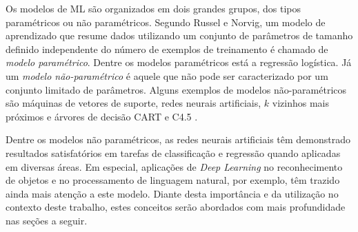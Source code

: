 Os modelos de ML são organizados em dois grandes grupos, dos tipos paramétricos ou não paramétricos. Segundo Russel e Norvig, um modelo de aprendizado que resume dados utilizando um conjunto de parâmetros de tamanho definido independente do número de exemplos de treinamento é chamado de \emph{modelo paramétrico}. Dentre os modelos paramétricos está a regressão logística. Já um \emph{modelo não-paramétrico} é aquele que não pode ser caracterizado por um conjunto limitado de parâmetros. Alguns exemplos de modelos não-paramétricos são máquinas de vetores de suporte, redes neurais artificiais, $k$ vizinhos mais próximos e árvores de decisão CART e C4.5 \cite{russell2016artificial}.

Dentre os modelos não paramétricos, as redes neurais artificiais têm demonstrado resultados satisfatórios em tarefas de classificação e regressão quando aplicadas em diversas áreas. Em especial, aplicações de \emph{Deep Learning} no reconhecimento de objetos e no processamento de linguagem natural, por exemplo, têm trazido ainda mais atenção a este modelo. Diante desta importância e da utilização no contexto deste trabalho, estes conceitos serão abordados com mais profundidade nas seções a seguir.
